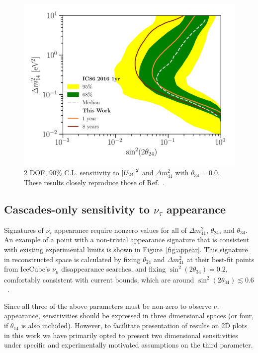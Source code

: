 \documentclass[main.tex]{subfiles}
\begin{document}
\begin{figure}
    \centering
    \includegraphics[width=0.99\linewidth]{figures/meows_sensitivity.png}
    \caption{2 DOF, 90\% C.L. sensitivity to $\left| U_{24} \right|^{2}$ and $\Delta m_{41}^{2}$ with $\theta_{34}=0.0$. These results closely reproduce those of Ref.~\cite{Aartsen_2020_prd}.}\label{fig:meowssense}
\end{figure}

\subsection{\label{sec:cascadesens} Cascades-only sensitivity to $\nu_{\tau}$ appearance}

Signatures of $\nu_{\tau}$ appearance require nonzero values for all of  $\Delta m_{41}^{2}$, $\theta_{24}$, and $\theta_{34}$.  An example of a point with a non-trivial appearance signature that is consistent with existing experimental limits is shown in Figure~\ref{fig:appear}. This signature in reconstructed space is calculated by fixing $\theta_{24}$ and $\Delta m^2_{41}$ at their best-fit points from IceCube's $\nu_\mu$ disappearance searches, and fixing $\sin^{2}(2\theta_{34})=0.2$, comfortably consistent with current bounds, which are around $\sin^{2}(2\theta_{34})\lesssim 0.6$~\cite{Aartsen_2017_dc, Adamson_2011}.

Since all three of the above parameters must be non-zero to observe $\nu_\tau$ appearance, sensitivities should be expressed in three dimensional spaces (or four, if $\theta_{14}$ is also included). However, to facilitate  presentation of results on 2D plots in this work we have primarily opted to present two dimensional sensitivities under specific and experimentally motivated assumptions on the third parameter. 
\end{document}

